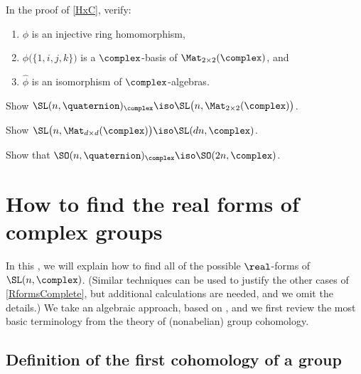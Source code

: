 \begin{exercises}

\item \label{HxCExer}
 In the proof of \cref{HxC}, verify:
 \begin{enumerate}
 \item $\phi$ is an injective ring homomorphism,
 \item $\phi \bigl( \{1,i,j,k\} \bigr)$ is a
$\complex$-basis of $\Mat_{2 \times 2}(\complex)$, and
 \item $\hat\phi$ is an isomorphism of $\complex$-algebras.
 \end{enumerate}

\item \label{SLnHxCExer}
 Show $\SL(n,\quaternion)_{\complex}
 \iso \SL \bigl( n, \Mat_{2 \times 2}(\complex) \bigr)$.

\item \label{Matd(Matn)}
 Show $\SL \bigl( n, \Mat_{d \times d}(\complex) \bigr)
 \iso \SL(dn,\complex)$.

\item \label{SOnHxC}
 Show that $\SO(n,\quaternion)_{\complex} \iso
\SO(2n,\complex)$. 

\end{exercises}









\section{How to find the real forms of complex groups} \label{GaloisCohoRealFormsSect}

In this , we will explain how to find all of the possible $\real$-forms of $\SL(n,\complex)$. (Similar techniques can be used to justify the other cases of \cref{RformsComplete}, but additional calculations are needed, and we omit the details.)
We take an algebraic approach, based on , and we first review the most basic terminology from the theory of (nonabelian) group cohomology.


\subsection{Definition of the first cohomology of a group}
 \label{GroupCohoSect}

